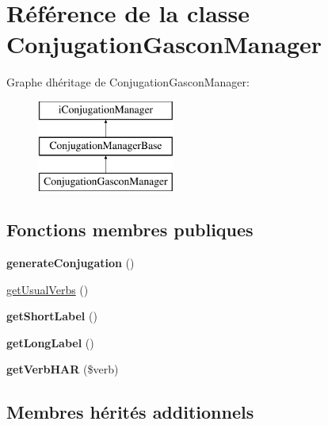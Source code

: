 \hypertarget{classConjugationGasconManager}{}\section{Référence de la classe Conjugation\+Gascon\+Manager}
\label{classConjugationGasconManager}
Graphe d\textquotesingle{}héritage de Conjugation\+Gascon\+Manager\+:\begin{figure}[H]
\begin{center}
\leavevmode
\includegraphics[height=3.000000cm]{classConjugationGasconManager}
\end{center}
\end{figure}
\subsection*{Fonctions membres publiques}
\begin{DoxyCompactItemize}
\item 
\hypertarget{classConjugationGasconManager_a2730ac29ac0ba6fd56c5896cefa297ac}{}\label{classConjugationGasconManager_a2730ac29ac0ba6fd56c5896cefa297ac} 
{\bfseries generate\+Conjugation} ()
\item 
\hyperlink{classConjugationGasconManager_a4117ecff48a5baa29d894f6174d88983}{get\+Usual\+Verbs} ()
\item 
\hypertarget{classConjugationGasconManager_a958775fb06109e0cea145f53308482b2}{}\label{classConjugationGasconManager_a958775fb06109e0cea145f53308482b2} 
{\bfseries get\+Short\+Label} ()
\item 
\hypertarget{classConjugationGasconManager_a5fc41ec1f99e255a8c57c7b7f382bc95}{}\label{classConjugationGasconManager_a5fc41ec1f99e255a8c57c7b7f382bc95} 
{\bfseries get\+Long\+Label} ()
\item 
\hypertarget{classConjugationGasconManager_a1a76a0fddebe5b28b70b532d28b0de2d}{}\label{classConjugationGasconManager_a1a76a0fddebe5b28b70b532d28b0de2d} 
{\bfseries get\+Verb\+H\+AR} (\$verb)
\end{DoxyCompactItemize}
\subsection*{Membres hérités additionnels}


